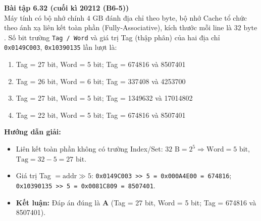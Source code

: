 \textbf{Bài tập 6.32 (cuối kì 20212 (B6-5))}\\
Máy tính có bộ nhớ chính $4\text{ GB}$ đánh địa chỉ theo byte, bộ nhớ Cache tổ chức theo ánh xạ liên kết toàn phần (Fully-Associative), kích thước mỗi line là $32\text{ byte}$. Số bit trường \texttt{Tag / Word} và giá trị Tag (thập phân) của hai địa chỉ \texttt{0x0149C003}, \texttt{0x10390135} lần lượt là:
\begin{enumerate}[label=\Alph*.]
    \item Tag = 27 bit, Word = 5 bit; Tag = 674816 và 8507401
    \item Tag = 26 bit, Word = 6 bit; Tag = 337408 và 4253700
    \item Tag = 27 bit, Word = 5 bit; Tag = 1349632 và 17014802
    \item Tag = 22 bit, Word = 5 bit; Tag = 674816 và 8507401
\end{enumerate}
\textbf{Hướng dẫn giải:}
\begin{itemize}
    \item Liên kết toàn phần không có trường Index/Set: $32\text{ B} = 2^5 \Rightarrow \text{Word} = 5\text{ bit}$, $\text{Tag} = 32 - 5 = 27\text{ bit}$.
    \item Giá trị Tag $= \text{addr} \gg 5$: \texttt{0x0149C003 >> 5 = 0x000A4E00 = 674816}; \texttt{0x10390135 >> 5 = 0x0081C809 = 8507401}.
    \item \textbf{Kết luận:} Đáp án đúng là \textbf{A} (Tag = 27 bit, Word = 5 bit; Tag = 674816 và 8507401).
\end{itemize}

